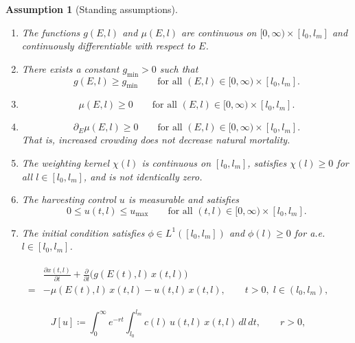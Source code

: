 \documentclass[10pt,a4paper]{amsart}
\newtheorem{assumption}{Assumption}
\begin{document}
\begin{assumption}[Standing assumptions]\label{ass:standing}
\begin{enumerate}[label=(H\arabic*)]
\item\label{H:reg}
The functions $g(E,l)$ and $\mu(E,l)$ are continuous on
$[0,\infty)\times[l_0,l_m]$ and continuously differentiable with respect to $E$.

\item\label{H:gpos}
There exists a constant $g_{\min}>0$ such that
\[
g(E,l)\ge g_{\min}
\qquad \text{for all } (E,l)\in[0,\infty)\times[l_0,l_m].
\]

\item\label{H:mupos}
\[
\mu(E,l)\ge 0
\qquad \text{for all } (E,l)\in[0,\infty)\times[l_0,l_m].
\]

\item\label{H:mumono}
\[
\partial_E\mu(E,l)\ge 0
\qquad \text{for all } (E,l)\in[0,\infty)\times[l_0,l_m].
\]
That is, increased crowding does not decrease natural mortality.

\item\label{H:chi}
The weighting kernel $\chi(l)$ is continuous on $[l_0,l_m]$, satisfies
$\chi(l)\ge 0$ for all $l\in[l_0,l_m]$, and is not identically zero.

\item\label{H:uadm}
The harvesting control $u$ is measurable and satisfies
\[
0\le u(t,l)\le u_{\max}
\qquad \text{for all } (t,l)\in[0,\infty)\times[l_0,l_m].
\]

\item\label{H:ic}
The initial condition satisfies $\phi\in L^1([l_0,l_m])$ and
$\phi(l)\ge 0$ for a.e.\ $l\in[l_0,l_m]$.
\end{enumerate}
\end{assumption}

\begin{align}\label{eq:state_pmp}
\begin{aligned}
&\frac{\partial x(t,l)}{\partial t}
+\frac{\partial}{\partial l}\Big(g(E(t),l)\,x(t,l)\Big) \\[4pt]
={}&
-\mu(E(t),l)\,x(t,l)-u(t,l)\,x(t,l),
\qquad t>0,\; l\in(l_0,l_m),
\end{aligned}
\end{align}

\begin{equation}\label{eq:objective_J}
J[u]
\coloneqq
\int_{0}^{\infty} e^{-rt}
\int_{l_0}^{l_m} c(l)\,u(t,l)\,x(t,l)\,dl\,dt,
\qquad r>0,
\end{equation}
\end{document}
